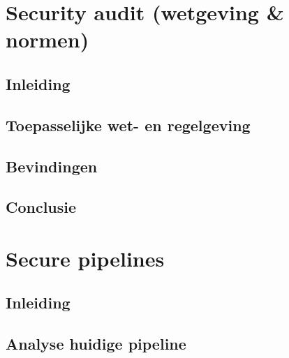 \documentclass[11pt, a4paper]{report}
\begin{document}

\chapter{Security audit (wetgeving \& normen)}

\section{Inleiding}

\section{Toepasselijke wet- en regelgeving}

\section{Bevindingen}

\section{Conclusie}


\chapter{Secure pipelines}

\section{Inleiding}

\section{Analyse huidige pipeline}
\end{document}
